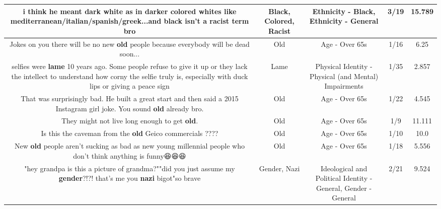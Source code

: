 \documentclass[11pt]{article}
\newlength\mylength
\begin{document}
\begin{center}
\begin{longtable}{|C{.65\mylength}|C{.30\mylength}|C{.12\mylength}|C{.12\mylength}|C{.12\mylength}|}
  \small i think he meant dark white as in darker \textbf{colored} whites like mediterranean/italian/spanish/greek...and \textbf{black} isn't a \textbf{racist} term bro\normalsize   & Black, Colored, Racist & Ethnicity - Black, Ethnicity - General & 3/19 & 15.789 \\  \hline
  \small Jokes on you there will be no new \textbf{old} people because everybody will be dead soon...\normalsize   & Old & Age - Over 65s & 1/16 & 6.25 \\  \hline
  \small selfies were \textbf{lame} 10 years ago. Some people refuse to give it up or they lack the intellect to understand how corny the selfie truly is, especially with duck lips or giving a peace sign\normalsize   & Lame & Physical Identity - Physical (and Mental) Impairments & 1/35 & 2.857 \\  \hline
  \small That was surprisingly bad. He built a great start and then said a 2015 Instagram girl joke. You sound \textbf{old} already bro.\normalsize   & Old & Age - Over 65s & 1/22 & 4.545 \\  \hline
  \small They might not live long enough to get \textbf{old}.\normalsize   & Old & Age - Over 65s & 1/9 & 11.111 \\  \hline
  \small Is this the caveman from the \textbf{old} Geico commercials ????\normalsize   & Old & Age - Over 65s & 1/10 & 10.0 \\  \hline
  \small New \textbf{old} people aren't sucking as bad as new young millennial people who don't think anything is funny😆😆😆\normalsize   & Old & Age - Over 65s & 1/18 & 5.556 \\  \hline
  \small "hey grandpa is this a picture of grandma?""did you just assume my \textbf{gender}?!?! that's me you \textbf{nazi} bigot"so brave\normalsize   & Gender, Nazi &  Ideological and Political Identity - General, Gender - General & 2/21 & 9.524 \\  \hline

\end{longtable}
\end{center}
\end{document}
